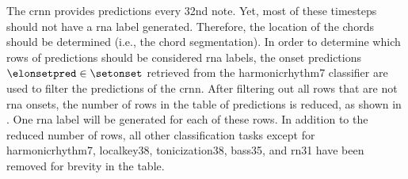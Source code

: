 
The \gls{crnn} provides predictions every \gls{32nd} note.
Yet, most of these timesteps should not have a \gls{rna}
label generated. Therefore, the location of the chords
should be determined (i.e., the chord segmentation). In
order to determine which rows of predictions should be
considered \gls{rna} labels, the onset predictions
$\elonsetpred \in \setonset$ retrieved from the
\gls{harmonicrhythm7} classifier are used to filter the
predictions of the \gls{crnn}. After filtering out all rows
that are not \gls{rna} onsets, the number of rows in the
table of predictions is reduced, as shown in
. One \gls{rna} label
will be generated for each of these rows. In addition to the
reduced number of rows, all other classification tasks
except for \gls{harmonicrhythm7}, \gls{localkey38},
\gls{tonicization38}, \gls{bass35}, and \gls{rn31} have been
removed for brevity in the table.

